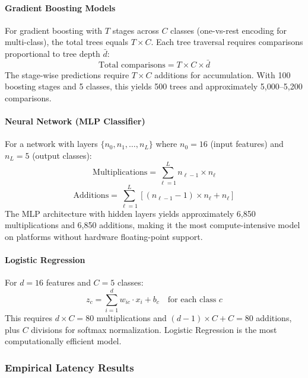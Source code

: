 \paragraph{Gradient Boosting Models}
For gradient boosting with $T$ stages across $C$ classes (one-vs-rest encoding for multi-class), the total trees equals $T \times C$. Each tree traversal requires comparisons proportional to tree depth $\bar{d}$:
\begin{equation}
    \text{Total comparisons} = T \times C \times \bar{d}
\end{equation}
The stage-wise predictions require $T \times C$ additions for accumulation. With 100 boosting stages and 5 classes, this yields 500 trees and approximately 5,000--5,200 comparisons.

\paragraph{Neural Network (MLP Classifier)}
For a network with layers $\{n_0, n_1, \ldots, n_L\}$ where $n_0 = 16$ (input features) and $n_L = 5$ (output classes):
\begin{equation}
    \text{Multiplications} = \sum_{\ell=1}^{L} n_{\ell-1} \times n_\ell
\end{equation}
\begin{equation}
    \text{Additions} = \sum_{\ell=1}^{L} \left[ (n_{\ell-1} - 1) \times n_\ell + n_\ell \right]
\end{equation}
The MLP architecture with hidden layers yields approximately 6,850 multiplications and 6,850 additions, making it the most compute-intensive model on platforms without hardware floating-point support.

\paragraph{Logistic Regression}
For $d = 16$ features and $C = 5$ classes:
\begin{equation}
    z_c = \sum_{i=1}^{d} w_{ic} \cdot x_i + b_c \quad \text{for each class } c
\end{equation}
This requires $d \times C = 80$ multiplications and $(d-1) \times C + C = 80$ additions, plus $C$ divisions for softmax normalization. Logistic Regression is the most computationally efficient model.

\subsubsection{Empirical Latency Results}

